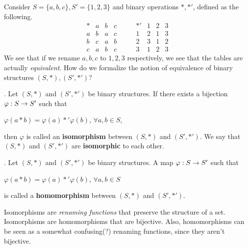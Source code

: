 
Consider \(S = \{a, b, c\}, S' = \{1, 2, 3\}\) and binary operations \(*, *'\), defined as the following.
\[
    \begin{array}{c|ccc}
        * & a & b & c \\ \hline
        a & b & a & c \\
        b & c & a & b \\
        c & a & b & c
    \end{array}
    \qquad
    \begin{array}{c|ccc}
        *' & 1 & 2 & 3 \\ \hline
        1  & 2 & 1 & 3 \\
        2  & 3 & 1 & 2 \\
        3  & 1 & 2 & 3
    \end{array}
\]
We see that if we rename \(a, b, c\) to \(1, 2, 3\) respectively, we see that the tables are actually \textit{equivalent}. How do we formalize the notion of equivalence of binary structures \((S, *), (S', *')\)?

.  Let \((S, *)\) and \((S', *')\) be binary structures. If there exists a bijection \(\varphi: S \rightarrow S'\) such that
\begin{center}
    \(\varphi(a * b) = \varphi(a) *' \varphi(b)\), \quad \(\forall a, b \in S\),
\end{center}
then \(\varphi\) is called an \textbf{isomorphism} between \((S, *)\) and \((S', *')\). We say that \((S, *)\) and \((S', *')\) are \textbf{isomorphic} to each other.

.  Let \((S, *)\) and \((S', *')\) be binary structures. A map \(\varphi: S \rightarrow S'\) such that
\begin{center}
    \(\varphi(a * b) = \varphi(a) *' \varphi(b)\), \quad \(\forall a, b \in S\)
\end{center}
is called a \textbf{homomorphism} between \((S, *)\) and \((S', *')\).

\rmk Isomorphisms are \textit{renaming functions} that preserve the structure of a set. Isomorphisms are homomorphisms that are bijective. Also, homomorphisms can be seen as a somewhat confusing(?) renaming functions, since they aren't bijective.

